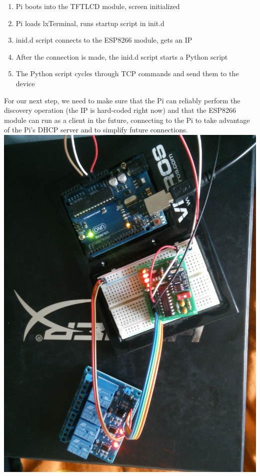 \documentclass[letterpaper,10pt]{article}
\begin{document}
\begin{enumerate}
    \item Pi boots into the TFTLCD module, screen initialized
    \item Pi loads lxTerminal, runs startup script in init.d
    \item inid.d script connects to the ESP8266 module, gets an IP
    \item After the connection is made, the inid.d script starts a Python
        script
    \item The Python script cycles through TCP commands and send them to the
        device
\end{enumerate}

For our next step, we need to make sure that the Pi can reliably perform the
discovery operation (the IP is hard-coded right now) and that the ESP8266
module can run as a client in the future, connecting to the Pi to take
advantage of the Pi's DHCP server and to simplify future connections.\\

\includegraphics[scale=0.1]{circuit.jpg}
\end{document}
